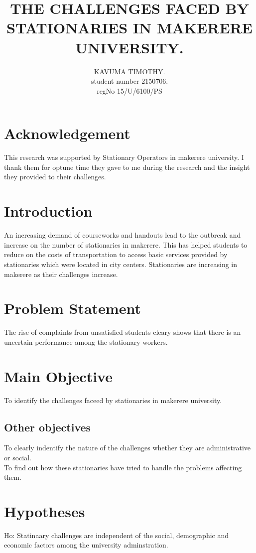 \documentclass[a4paper,10pt]{article}
\begin{document}
\title{THE CHALLENGES FACED BY STATIONARIES IN MAKERERE UNIVERSITY.}
\author{
KAVUMA TIMOTHY.\\
student number 2150706.\\
regNo  15/U/6100/PS
}


\maketitle
\newpage
\section{Acknowledgement}
This research was supported by Stationary Operators in makerere university. I thank  them for optune time they gave to me during the research  and the insight they provided to their challenges.

\tableofcontents
\newpage
{}
\section{Introduction}
An increasing demand of courseworks and handouts lead to the outbreak and increase on the number of stationaries in makerere. This has helped students to reduce on the costs of transportation to access basic services provided by stationaries which were located in city centers. Stationaries are increasing in makerere as their challenges increase.

\section{ Problem Statement}
The rise of complaints from unsatisfied students cleary shows that there is an uncertain performance among the stationary workers. 
\section{Main Objective}
To identify the challenges faceed by stationaries in makerere university.
\subsection{Other objectives}
To clearly indentify the nature of the challenges whether they are administrative or social.\\
To find out how these stationaries have tried to handle the problems affecting them.

\section{Hypotheses}
Ho: Statinaary challenges are independent of the social, demographic and economic factors among the university adminstration.
\end{document}

